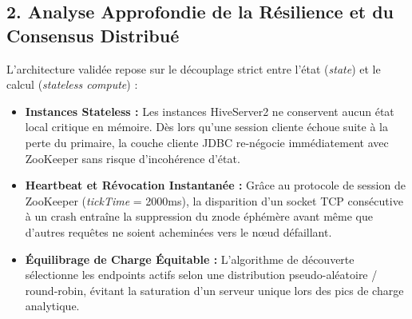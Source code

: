 \documentclass[11pt,a4paper]{article}
\begin{document}
\subsection*{2. Analyse Approfondie de la Résilience et du Consensus Distribué}
L'architecture validée repose sur le découplage strict entre l'état (\textit{state}) et le calcul (\textit{stateless compute}) :
\begin{itemize}[leftmargin=1.2em, topsep=1.5pt, itemsep=1.5pt]
    \item \textbf{Instances Stateless :} Les instances HiveServer2 ne conservent aucun état local critique en mémoire. Dès lors qu'une session cliente échoue suite à la perte du primaire, la couche cliente JDBC re-négocie immédiatement avec ZooKeeper sans risque d'incohérence d'état.
    \item \textbf{Heartbeat et Révocation Instantanée :} Grâce au protocole de session de ZooKeeper (\textit{tickTime} = 2000ms), la disparition d'un socket TCP consécutive à un crash entraîne la suppression du znode éphémère avant même que d'autres requêtes ne soient acheminées vers le nœud défaillant.
    \item \textbf{Équilibrage de Charge Équitable :} L'algorithme de découverte sélectionne les endpoints actifs selon une distribution pseudo-aléatoire / round-robin, évitant la saturation d'un serveur unique lors des pics de charge analytique.
\end{itemize}
\end{document}

